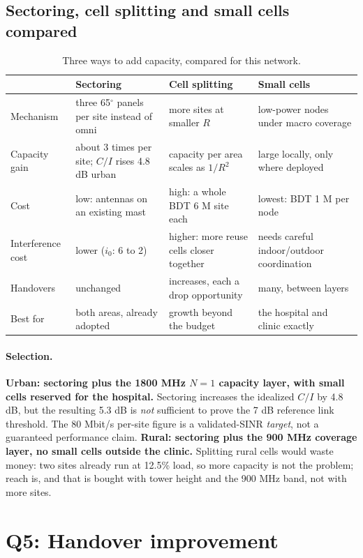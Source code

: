 \documentclass[9pt,a4paper]{extarticle}
\newcommand{\key}[1]{\textbf{#1}}
\begin{document}
\subsection{Sectoring, cell splitting and small cells compared}
\begin{table}[H]\centering\small
\caption{Three ways to add capacity, compared for this network.}
\begin{tabularx}{\textwidth}{@{}p{2.4cm}XXX@{}}
\toprule
& \textbf{Sectoring} & \textbf{Cell splitting} & \textbf{Small cells} \\
\midrule
Mechanism & three 65$^\circ$ panels per site instead of omni & more sites at smaller $R$ & low-power nodes under macro coverage \\
Capacity gain & about 3 times per site; $C/I$ rises 4.8 dB urban & capacity per area scales as $1/R^2$ & large locally, only where deployed \\
Cost & low: antennas on an existing mast & high: a whole BDT 6 M site each & lowest: BDT 1 M per node \\
Interference cost & lower ($i_0$: 6 to 2) & higher: more reuse cells closer together & needs careful indoor/outdoor coordination \\
Handovers & unchanged & increases, each a drop opportunity & many, between layers \\
Best for & both areas, already adopted & growth beyond the budget & the hospital and clinic exactly \\
\bottomrule
\end{tabularx}
\end{table}

\paragraph{Selection.} \key{Urban: sectoring plus the 1800 MHz $N=1$ capacity layer, with small
cells reserved for the hospital.} Sectoring increases the idealized $C/I$ by 4.8 dB, but the resulting 5.3 dB is
\emph{not} sufficient to prove the 7 dB reference link threshold. The 80 Mbit/s
per-site figure is a validated-SINR \emph{target}, not a guaranteed performance claim.
\key{Rural: sectoring plus the 900 MHz coverage layer, no small cells outside the clinic.}
Splitting rural cells would waste money: two sites already run at 12.5\% load, so more capacity is
not the problem; reach is, and that is bought with tower height and the 900 MHz band, not with
more sites.

\section{Q5: Handover improvement}
\label{sec:q5}
\end{document}
